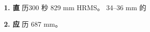 \documentclass[11pt,a4paper]{article}
\numberwithin{equation}{section}
\numberwithin{figure}{section}
\begin{document}
\textbf{1. {\cjkfont 直}\allowbreak{}} {\cjkfont 历}\allowbreak{}300 {\cjkfont 秒}\allowbreak{} 829 mm HRMS{\cjkfont 。}\allowbreak{} 34–36 mm {\cjkfont 的}\allowbreak{}

\textbf{2. {\cjkfont 应}\allowbreak{}} {\cjkfont 历}\allowbreak{} 687 mm{\cjkfont 。}\allowbreak{}
\end{document}
